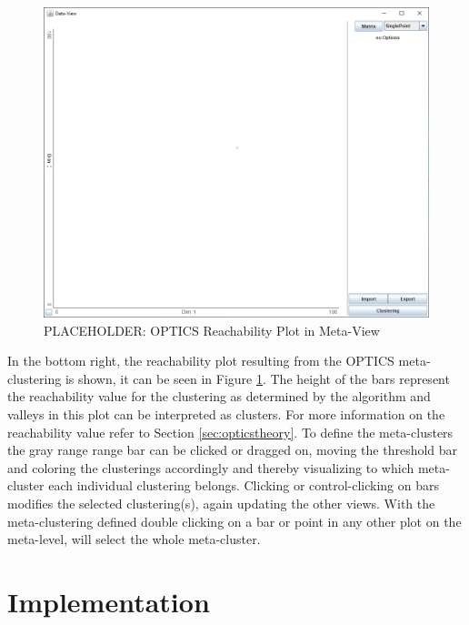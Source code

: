 \documentclass[
	a4paper,
	english,
	twoside,
	openright,               
	11pt                            
	]{report}
\begin{document}
\begin{figure}[h]
	\centering
	\includegraphics[scale=.45]{data-view}
	\caption{PLACEHOLDER: OPTICS Reachability Plot in Meta-View }
	\label{fig:opticsplot}
\end{figure}

In the bottom right, the reachability plot resulting from the OPTICS meta-clustering is shown, it can be seen in Figure \ref{fig:opticsplot}. The height of the bars represent the reachability value for the clustering as determined by the algorithm and valleys in this plot can be interpreted as clusters. For more information on the reachability value refer to Section \ref{sec:opticstheory}. To define the meta-clusters the gray range range bar can be clicked or dragged on, moving the threshold bar and coloring the clusterings accordingly and thereby visualizing to which meta-cluster each individual clustering belongs. Clicking or control-clicking on bars modifies the selected clustering(s), again updating the other views. With the meta-clustering defined double clicking on a bar or point in any other plot on the meta-level, will select the whole meta-cluster.













\chapter{Implementation}\label{cha:impl}
\end{document}
